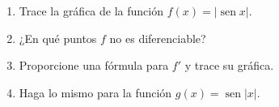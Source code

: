\item 
\begin{enumerate}
    \item[(a)] Trace la gráfica de la función $f(x) = |\operatorname{sen} x|$.
    \item[(b)] ¿En qué puntos $f$ no es diferenciable?
    \item[(c)] Proporcione una fórmula para $f'$ y trace su gráfica.
    \item[(d)] Haga lo mismo para la función $g(x) = \operatorname{sen} |x|$.
\end{enumerate}
